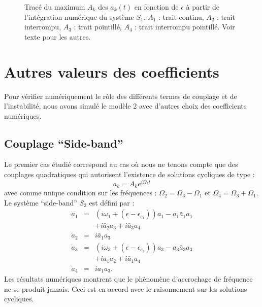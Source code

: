 \documentclass{book}
\begin{document}
\begin{figure}[htb]
 \centerline{}
 \caption{Trac\'e du maximum $A_k$ des $a_k(t)$ en fonction de $\epsilon$
\`a partir de l'int\'egration num\'erique du syst\`eme $S_1$. $A_1$ :
trait continu, $A_2$ : trait interrompu, $A_3$ : trait pointill\'e,
$A_4$ : trait interrompu pointill\'e. Voir texte pour les autres.} 
 \label{amplieps}
\end{figure}




\section{Autres valeurs des coefficients}
Pour v\'erifier num\'eriquement le r\^ole des diff\'erents termes de
couplage et de l'instabilit\'e, nous avons simul\'e le
mod\`ele 2 avec 
d'autres choix des coefficients num\'eriques.

\subsection{Couplage ``Side-band''}
Le premier cas \'etudi\'e correspond au cas o\`u nous ne tenons compte
que des couplages quadratiques qui autorisent l'existence de solutions
cycliques de type :
\begin{equation}
a_k=A_k e^{i\Omega_k t}
\end{equation}
avec comme unique condition sur les fr\'equences
: $\Omega_2=\Omega_3-\Omega_1$ et  $\Omega_4=\Omega_3+\Omega_1$.
Le syst\`eme ``side-band'' $S_2$ est d\'efini par :
\begin{eqnarray}
\dot{a}_1&=&(i\omega_1+(\epsilon-\epsilon_{c_1}))a_1-a_1\bar{a}_1a_1\nonumber\\
&&+i\bar{a}_2{a}_3+i\bar{a}_3a_4\\
\dot{a}_2&=&i\bar{a}_1{a}_3\\
\dot{a}_3&=&(i\omega_3+(\epsilon-\epsilon_{c_3}))a_3-a_3\bar{a}_3a_3\nonumber\\
&&+ia_1a_2+i\bar{a}_1a_4\\
\dot{a}_4&=&ia_1a_3.
\end{eqnarray}
Les r\'esultats num\'eriques montrent que le ph\'enom\`ene d'accrochage de
fr\'equence ne se produit jamais. Ceci est en accord avec le raisonnement
sur les solutions cycliques.
\end{document}
